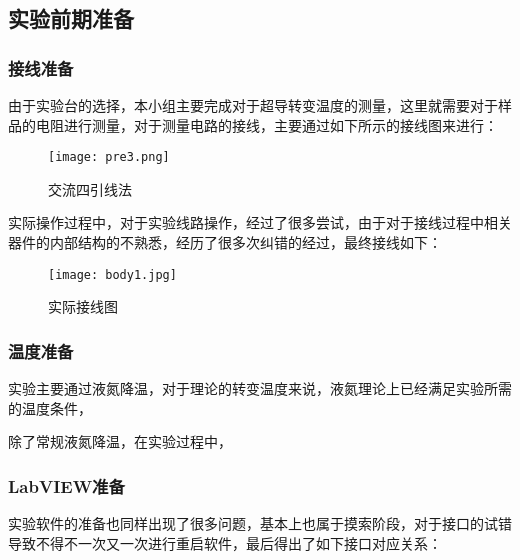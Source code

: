 

\clearpage
{}
\subsection{实验前期准备}

\subsubsection{接线准备}

由于实验台的选择，本小组主要完成对于超导转变温度的测量，这里就需要对于样品的电阻进行测量，对于测量电路的接线，主要通过如下所示的接线图来进行：
\begin{figure}[{H}]
	\centering
	\texttt{[image: pre3.png]}
	\caption{交流四引线法}
	\label{}
\end{figure}

实际操作过程中，对于实验线路操作，经过了很多尝试，由于对于接线过程中相关器件的内部结构的不熟悉，经历了很多次纠错的经过，最终接线如下：
\begin{figure}[{H}]
	\centering
	\texttt{[image: body1.jpg]}
	\caption{实际接线图}
	\label{}
\end{figure}

\subsubsection{温度准备}

实验主要通过液氮降温，对于理论的转变温度来说，液氮理论上已经满足实验所需的温度条件，

除了常规液氮降温，在实验过程中，

\subsubsection{LabVIEW准备}

实验软件的准备也同样出现了很多问题，基本上也属于摸索阶段，对于接口的试错导致不得不一次又一次进行重启软件，最后得出了如下接口对应关系：

